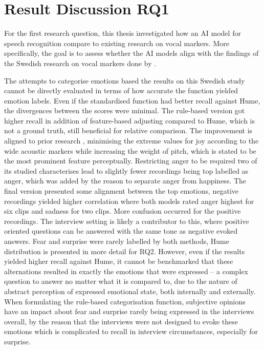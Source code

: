 \section{Result Discussion RQ1}

For the first research question, this thesis investigated how an AI model for speech recognition
compare to existing research on vocal markers. More specifically, the goal is to assess whether
the AI models align with the findings of the Swedish research on vocal markers done by \textcite{Ekberg2023}. 

The attempts to categorise emotions based the results on this Swedish study cannot be directly evaluated in terms of how accurate the function yielded emotion labels. Even if the standardised function had better recall against Hume, the divergences between the scores were minimal. 
The rule-based version got higher recall in addition of feature-based adjusting compared to Hume, which is not a ground truth, still beneficial for relative comparison. 
The improvement is aligned to prior research \autocites{Banse1996}{Ekberg2023}, minimising the extreme values for joy according to the wide acoustic markers while increasing the weight of pitch, which is stated to be the most prominent feature perceptually. 
Restricting anger to be required two of its studied characterises lead to slightly fewer recordings being top labelled as anger, which was added by the reason to separate anger from happiness. The final version presented some alignment between the top emotions, negative recordings yielded higher correlation where both models rated anger highest for six clips and sadness for two clips. More confusion occurred for the positive recordings. 
The interview setting is likely a contributor to this, where positive oriented questions can be answered with the same tone as negative evoked answers. 
Fear and surprise were rarely labelled by both methods, Hume distribution is presented in more detail for RQ2. 
However, even if the results yielded higher recall against Hume, it cannot be benchmarked that these alternations resulted in exactly the emotions that were expressed – a complex question to answer no matter what it is compared to, due to the nature of abstract perception of expressed emotional state, both internally and externally. When formulating the rule-based categorisation function, subjective opinions have an impact about fear and surprise rarely being expressed in the interviews overall, 
by the reason that the interviews were not designed to evoke these emotions which is complicated to recall in interview circumstances, especially for surprise. 

